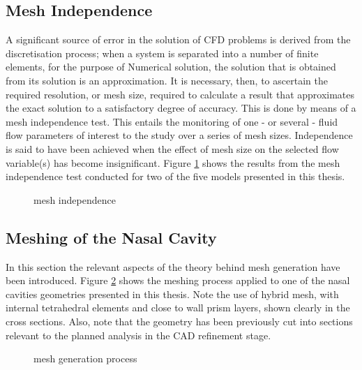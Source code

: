 \subsection{Mesh Independence}

A significant source of error in the solution of CFD problems is derived from the discretisation process; when a system is separated into a number of finite elements, for the purpose of Numerical solution, the solution that is obtained from its solution is an approximation. It is necessary, then, to ascertain the required resolution, or mesh size, required to calculate a result that approximates the exact solution to a satisfactory degree of accuracy. This is done by means of a mesh independence test. This entails the monitoring of one - or several - fluid flow parameters of interest to the study over a series of mesh sizes. Independence is said to have been achieved when the effect of mesh size on the selected flow variable(s) has become insignificant. Figure \ref{fig:mind} shows the results from the mesh independence test conducted for two of the five models presented in this thesis.

\begin{figure}

  \caption{mesh independence} \label{fig:mind}

\end{figure}
\subsection{Meshing of the Nasal Cavity}

In this section the relevant aspects of the theory behind mesh generation have been introduced. Figure \ref{fig:cavme} shows the meshing process applied to one of the nasal cavities geometries presented in this thesis. Note the use of hybrid mesh, with internal tetrahedral elements and close to wall prism layers, shown clearly in the cross sections. Also, note that the geometry has been previously cut into sections relevant to the planned analysis in the CAD refinement stage.

\begin{figure}
  \caption{mesh generation process} \label{fig:cavme}
\end{figure}
